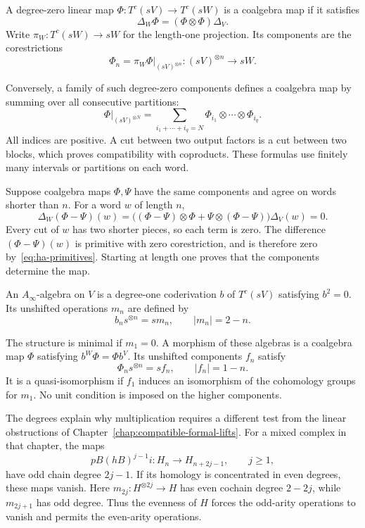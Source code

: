A degree-zero linear map $\Phi:T^c(sV)\to T^c(sW)$ is a
coalgebra map if it satisfies
\[
 \Delta_W\Phi=(\Phi\otimes\Phi)\Delta_V.
\]
Write $\pi_W:T^c(sW)\to sW$ for the length-one projection.
Its components are the corestrictions
\[
 \Phi_n=\pi_W\Phi|_{(sV)^{\otimes n}}:(sV)^{\otimes n}\to sW.
\]

Conversely, a family of such degree-zero components defines a
coalgebra map by summing over all consecutive partitions:
\begin{equation}\label{eq:ha-coalgebra-map}
 \Phi|_{(sV)^{\otimes N}}
 =\sum_{i_1+\cdots+i_q=N}\Phi_{i_1}\otimes\cdots\otimes\Phi_{i_q}.
\end{equation}
All indices are positive. A cut between two output factors is a cut
between two blocks, which proves compatibility with coproducts.
These formulas use finitely many intervals or partitions on each word.

Suppose coalgebra maps $\Phi,\Psi$ have the same components and
agree on words shorter than $n$. For a word $w$ of length $n$,
\[
 \Delta_W(\Phi-\Psi)(w)
 =\bigl((\Phi-\Psi)\otimes\Phi+
                \Psi\otimes(\Phi-\Psi)\bigr)\Delta_V(w)=0.
\]
Every cut of $w$ has two shorter pieces, so each term is zero.
The difference $(\Phi-\Psi)(w)$ is primitive with zero corestriction,
and is therefore zero by~\eqref{eq:ha-primitives}.
Starting at length one proves that the components determine the map.

\begin{definition}\label{def:ha-ainfinity}
An $A_\infty$-algebra on $V$ is a degree-one coderivation $b$ of
$T^c(sV)$ satisfying $b^2=0$. Its unshifted operations $m_n$ are
defined by
\[
 b_n s^{\otimes n}=s m_n,\qquad |m_n|=2-n.
\]

The structure is minimal if $m_1=0$. A morphism of these algebras
is a coalgebra map $\Phi$ satisfying $b^W\Phi=\Phi b^V$.
Its unshifted components $f_n$ satisfy
\[
 \Phi_n s^{\otimes n}=s f_n,\qquad |f_n|=1-n.
\]
It is a quasi-isomorphism if $f_1$ induces an isomorphism of the
cohomology groups for $m_1$.
No unit condition is imposed on the higher components.
\end{definition}

The degrees explain why multiplication requires a different test
from the linear obstructions of Chapter~\ref{chap:compatible-formal-lifts}.
For a mixed complex in that chapter, the maps
\[
 pB(hB)^{j-1}i:H_n\longrightarrow H_{n+2j-1},\qquad j\geq1,
\]
have odd chain degree $2j-1$.
If its homology is concentrated in even degrees, these maps vanish.
Here $m_{2j}:H^{\otimes2j}\to H$ has even cochain degree $2-2j$,
while $m_{2j+1}$ has odd degree.
Thus the evenness of $H$ forces the odd-arity operations to vanish
and permits the even-arity operations.

